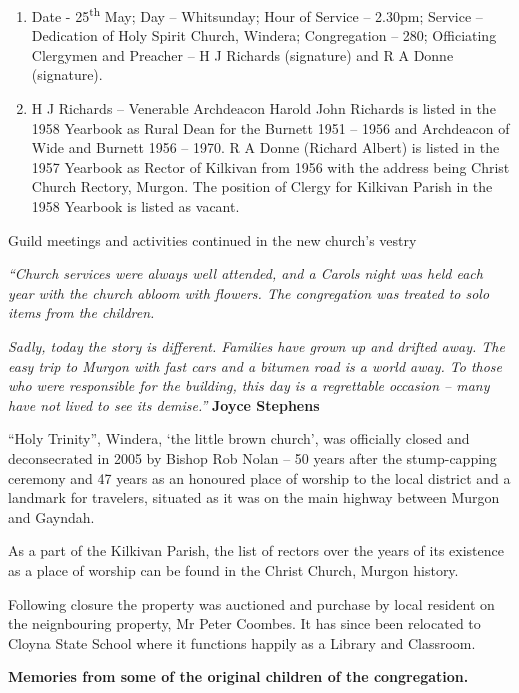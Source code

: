 \begin{enumerate}
\def\labelenumi{\arabic{enumi}.}
\item
  Date - 25\textsuperscript{th} May; Day -- Whitsunday; Hour of Service
  -- 2.30pm; Service -- Dedication of Holy Spirit Church, Windera;
  Congregation -- 280; Officiating Clergymen and Preacher -- H J
  Richards (signature) and R A Donne (signature).
\item
  H J Richards -- Venerable Archdeacon Harold John Richards is listed in
  the 1958 Yearbook as Rural Dean for the Burnett 1951 -- 1956 and
  Archdeacon of Wide and Burnett 1956 -- 1970. R A Donne (Richard
  Albert) is listed in the 1957 Yearbook as Rector of Kilkivan from 1956
  with the address being Christ Church Rectory, Murgon. The position of
  Clergy for Kilkivan Parish in the 1958 Yearbook is listed as vacant.
\end{enumerate}

Guild meetings and activities continued in the new church's vestry

\emph{``Church services were always well attended, and a Carols night
was held each year with the church abloom with flowers. The congregation
was treated to solo items from the children.}

\emph{Sadly, today the story is different. Families have grown up and
drifted away. The easy trip to Murgon with fast cars and a bitumen road
is a world away. To those who were responsible for the building, this
day is a regrettable occasion -- many have not lived to see its
demise.''} \textbf{Joyce Stephens}

``Holy Trinity'', Windera, `the little brown church', was officially
closed and deconsecrated in 2005 by Bishop Rob Nolan -- 50 years after
the stump-capping ceremony and 47 years as an honoured place of worship
to the local district and a landmark for travelers, situated as it was
on the main highway between Murgon and Gayndah.

As a part of the Kilkivan Parish, the list of rectors over the years of
its existence as a place of worship can be found in the Christ Church,
Murgon history.

Following closure the property was auctioned and purchase by local
resident on the neignbouring property, Mr Peter Coombes. It has since
been relocated to Cloyna State School where it functions happily as a
Library and Classroom.

\textbf{Memories from some of the original children of the
congregation.}

